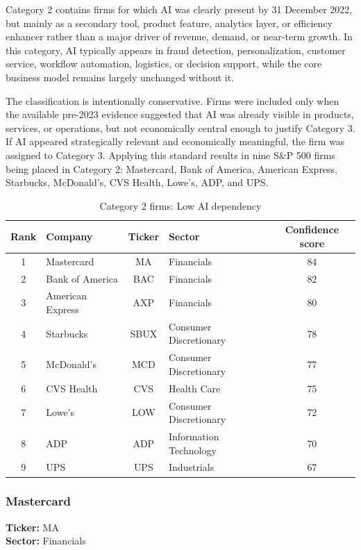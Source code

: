 \documentclass{article}
\begin{document}
Category 2 contains firms for which AI was clearly present by 31 December 2022, but mainly as a secondary tool, product feature, analytics layer, or efficiency enhancer rather than a major driver of revenue, demand, or near-term growth. In this category, AI typically appears in fraud detection, personalization, customer service, workflow automation, logistics, or decision support, while the core business model remains largely unchanged without it.

The classification is intentionally conservative. Firms were included only when the available pre-2023 evidence suggested that AI was already visible in products, services, or operations, but not economically central enough to justify Category 3. If AI appeared strategically relevant and economically meaningful, the firm was assigned to Category 3. Applying this standard results in nine S\&P 500 firms being placed in Category 2: Mastercard, Bank of America, American Express, Starbucks, McDonald's, CVS Health, Lowe's, ADP, and UPS.

\begin{table}[H]
\centering
\caption{Category 2 firms: Low AI dependency}
\begin{tabular}{|c|l|c|l|c|}
\hline
\textbf{Rank} & \textbf{Company} & \textbf{Ticker} & \textbf{Sector} & \textbf{Confidence score} \\ \hline
1 & Mastercard & MA & Financials & 84 \\ \hline
2 & Bank of America & BAC & Financials & 82 \\ \hline
3 & American Express & AXP & Financials & 80 \\ \hline
4 & Starbucks & SBUX & Consumer Discretionary & 78 \\ \hline
5 & McDonald's & MCD & Consumer Discretionary & 77 \\ \hline
6 & CVS Health & CVS & Health Care & 75 \\ \hline
7 & Lowe's & LOW & Consumer Discretionary & 72 \\ \hline
8 & ADP & ADP & Information Technology & 70 \\ \hline
9 & UPS & UPS & Industrials & 67 \\ \hline
\end{tabular}
\label{tab:category2}
\end{table}

\subsubsection*{Mastercard}
\textbf{Ticker:} MA \\
\textbf{Sector:} Financials
\end{document}
